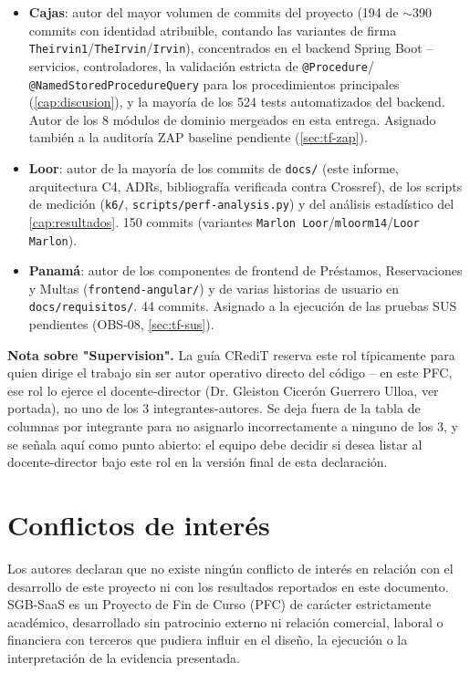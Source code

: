 \begin{itemize}[leftmargin=1.2cm]
  \item \textbf{Cajas}: autor del mayor volumen de commits del proyecto
    (194 de $\sim$390 commits con identidad atribuible, contando las
    variantes de firma \texttt{Theirvin1}/\texttt{TheIrvin}/\texttt{Irvin}),
    concentrados en el backend Spring Boot -- servicios, controladores,
    la validación estricta de \texttt{@Procedure}/
    \texttt{@NamedStoredProcedureQuery} para los procedimientos
    principales (\autoref{cap:discusion}), y la mayoría
    de los 524 tests automatizados del backend. Autor de los 8 módulos
    de dominio mergeados en esta entrega. Asignado también a la
    auditoría ZAP baseline pendiente (\autoref{sec:tf-zap}).
  \item \textbf{Loor}: autor de la mayoría de los commits de
    \texttt{docs/} (este informe, arquitectura C4, ADRs, bibliografía
    verificada contra Crossref), de los scripts de medición
    (\texttt{k6/}, \texttt{scripts/perf-analysis.py}) y del análisis
    estadístico del \autoref{cap:resultados}. 150 commits (variantes
    \texttt{Marlon Loor}/\texttt{mloorm14}/\texttt{Loor Marlon}).
  \item \textbf{Panamá}: autor de los componentes de frontend de
    Préstamos, Reservaciones y Multas (\texttt{frontend-angular/}) y de
    varias historias de usuario en \texttt{docs/requisitos/}. 44
    commits. Asignado a la ejecución de las pruebas SUS pendientes
    (OBS-08, \autoref{sec:tf-sus}).
\end{itemize}

\textbf{Nota sobre "Supervision".} La guía CRediT reserva este rol
típicamente para quien dirige el trabajo sin ser autor operativo directo
del código -- en este PFC, ese rol lo ejerce el docente-director (Dr.
Gleiston Cicerón Guerrero Ulloa, ver portada), no uno de los 3
integrantes-autores. Se deja fuera de la tabla de columnas por
integrante para no asignarlo incorrectamente a ninguno de los 3, y se
señala aquí como punto abierto: el equipo debe decidir si desea listar
al docente-director bajo este rol en la versión final de esta
declaración.

\section{Conflictos de interés}

Los autores declaran que no existe ningún conflicto de interés en
relación con el desarrollo de este proyecto ni con los resultados
reportados en este documento. SGB-SaaS es un Proyecto de Fin de Curso
(PFC) de carácter estrictamente académico, desarrollado sin patrocinio
externo ni relación comercial, laboral o financiera con terceros que
pudiera influir en el diseño, la ejecución o la interpretación de la
evidencia presentada.

